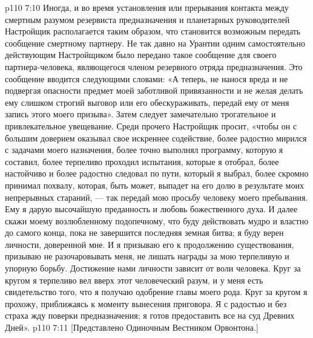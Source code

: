\vs p110 7:10 \pc Иногда, и во время установления или прерывания контакта между смертным разумом резервиста предназначения и планетарных руководителей Настройщик располагается таким образом, что становится возможным передать сообщение смертному партнеру. Не так давно на Урантии одним самостоятельно действующим Настройщиком было передано такое сообщение для своего партнера\hyp{}человека, являющегося членом резервного отряда предназначения. Это сообщение вводится следующими словами: «А теперь, не нанося вреда и не подвергая опасности предмет моей заботливой привязанности и не желая делать ему слишком строгий выговор или его обескураживать, передай ему от меня запись этого моего призыва». Затем следует замечательно трогательное и привлекательное увещевание. Среди прочего Настройщик просит, «чтобы он с большим доверием оказывал свое искреннее содействие, более радостно мирился с задачами моего назначения, более точно выполнял программу, которую я составил, более терпеливо проходил испытания, которые я отобрал, более настойчиво и более радостно следовал по пути, который я выбрал, более скромно принимал похвалу, которая, быть может, выпадет на его долю в результате моих непрерывных стараний, --- так передай мою просьбу человеку моего пребывания. Ему я дарую высочайшую преданность и любовь божественного духа. И далее скажи моему возлюбленному подопечному, что буду действовать мудро и властно до самого конца, пока не завершится последняя земная битва; я буду верен личности, доверенной мне. И я призываю его к продолжению существования, призываю не разочаровывать меня, не лишать награды за мою терпеливую и упорную борьбу. Достижение нами личности зависит от воли человека. Круг за кругом я терпеливо вел вверх этот человеческий разум, и у меня есть свидетельство того, что я получаю одобрение главы моего рода. Круг за кругом я прохожу, приближаясь к моменту вынесения приговора. Я с радостью и без страха жду поверки предназначения; я готов предоставить все на суд Древних Дней».
\vsetoff
\vs p110 7:11 [Представлено Одиночным Вестником Орвонтона.]
